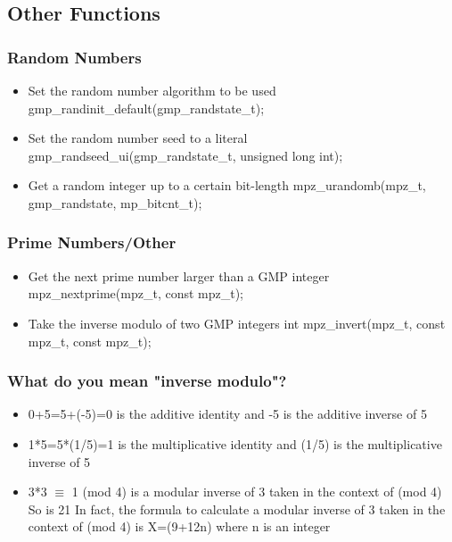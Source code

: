 \subsection{Other Functions}

\begin{frame}
\frametitle{Random Numbers}
  \begin{itemize}
    \item Set the random number algorithm to be used\break
    gmp\_randinit\_default(gmp\_randstate\_t);
    \item Set the random number seed to a literal\break
    gmp\_randseed\_ui(gmp\_randstate\_t, unsigned long int);
    \item Get a random integer up to a certain bit-length\break
    mpz\_urandomb(mpz\_t, gmp\_randstate, mp\_bitcnt\_t);
  \end{itemize}
\end{frame}

\begin{frame}
\frametitle{Prime Numbers/Other}
  \begin{itemize}
    \item Get the next prime number larger than a GMP integer\break
    mpz\_nextprime(mpz\_t, const mpz\_t);
    \item Take the inverse modulo of two GMP integers\break
    int mpz\_invert(mpz\_t, const mpz\_t, const mpz\_t);
  \end{itemize}
\end{frame}

\begin{frame}
\frametitle{What do you mean "inverse modulo"?}
  \begin{itemize}
    \item 0+5=5+(-5)=0 is the additive identity and -5 is the additive inverse of 5
    \item 1*5=5*(1/5)=1 is the multiplicative identity and (1/5) is the multiplicative inverse of 5
    \item 3*3 $\equiv$ 1 (mod 4) is a modular inverse of 3 taken in the context of (mod 4)\break
    So is 21\break
    In fact, the formula to calculate a modular inverse of 3 taken
    in the context of (mod 4) is X=(9+12n) where n is an integer
  \end{itemize}
\end{frame}
